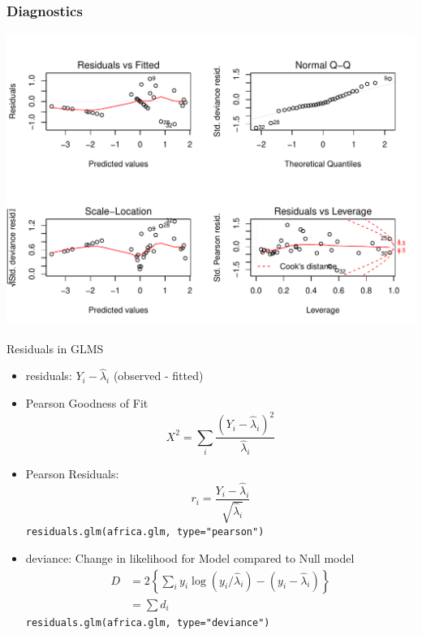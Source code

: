 \documentclass[handout]{beamer}\usepackage[]{graphicx}\usepackage[]{color}
\makeatletter
\def\maxwidth{ %
  \ifdim\Gin@nat@width>\linewidth
    \linewidth
  \else
    \Gin@nat@width
  \fi
}
\newenvironment{knitrout}{}{} %
\makeatother
\begin{document}
\begin{frame}[fragile]\frametitle{Diagnostics}
\begin{knitrout}
\color{fgcolor}
\includegraphics[width=\maxwidth]{figure/diag-1} 

\end{knitrout}

\end{frame}

\begin{frame} {Residuals in GLMS}

\begin{itemize}
\item residuals:  $Y_i - \hat{\lambda}_i$  (observed - fitted)
\item Pearson Goodness of Fit
$$X^2 = \sum_i \frac{(Y_i -  \hat{\lambda}_i)^2} {\hat{\lambda}_i}$$
\item Pearson Residuals:
$$r_i =  \frac{Y_i -  \hat{\lambda}_i}  {\sqrt{ \hat{\lambda}_i } }$$
{\tt residuals.glm(africa.glm, type="pearson")}
\item deviance: Change in likelihood for Model compared to Null model
\begin{align*}
D & = 2 \left\{
\sum_i y_i \log(y_i/\hat{\lambda}_i) - (y_i - \hat{\lambda}_i)
\right\} \\
 &  =  \sum d_i
 \end{align*}
 {\tt residuals.glm(africa.glm, type="deviance")}
\end{itemize}
\end{frame}
\end{document}
